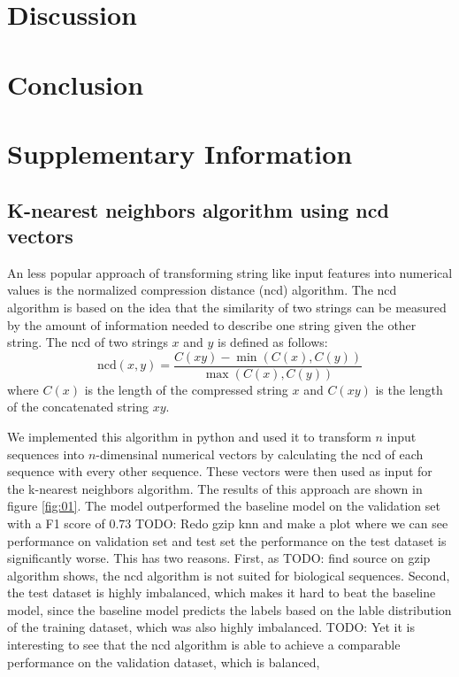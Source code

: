 \documentclass{bioinfo}
\begin{document}
\section{Discussion}
\lipsum[1]

\section{Conclusion}
\lipsum[1]

\section{Supplementary Information}
\lipsum[1]

\subsection{K-nearest neighbors algorithm using ncd vectors}
An less popular approach of transforming string like input features into numerical values is the normalized compression distance (ncd) algorithm. 
The ncd algorithm is based on the idea that the similarity of two strings can be measured by the amount of information needed to describe one string given the other string. The ncd of two strings $x$ and $y$ is defined as follows:
\begin{equation}
	\text{ncd}(x,y) = \frac{C(xy)-\min(C(x),C(y))}{\max(C(x),C(y))}
\end{equation}
where $C(x)$ is the length of the compressed string $x$  and $C(xy)$ is the length of the concatenated string $xy$. 

We implemented this algorithm in python and used it to transform $n$ input sequences into $n$-dimensinal numerical vectors by 
calculating the ncd of each sequence with every other sequence. These vectors were then used as input for the  k-nearest neighbors algorithm.
The results of this approach are shown in figure \ref{fig:01}. 
The model outperformed the baseline model on the validation set with a F1 score of $0.73$ TODO: Redo gzip knn and make a plot where we can see performance on validation set and test set
the performance on the test dataset is significantly worse. This has two reasons. First, as TODO: find source on gzip algorithm
shows, the ncd algorithm is not suited for biological sequences. Second, the test dataset is highly imbalanced, which makes it hard to beat the baseline model, 
since the baseline model predicts the labels based on the lable distribution of the training dataset, which was also highly imbalanced.
TODO: Yet it is interesting to see that the ncd algorithm is able to achieve a comparable performance on the validation dataset, which is balanced,
\end{document}
